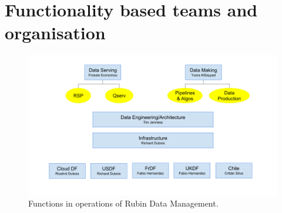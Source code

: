 \section{Functionality based teams and organisation} \label{sec:org}


\begin{figure}
\includegraphics[width=1.0\textwidth]{DM-OPS}
\caption{Functions in operations of Rubin Data Management.\label{fig:org}}
\end{figure}
